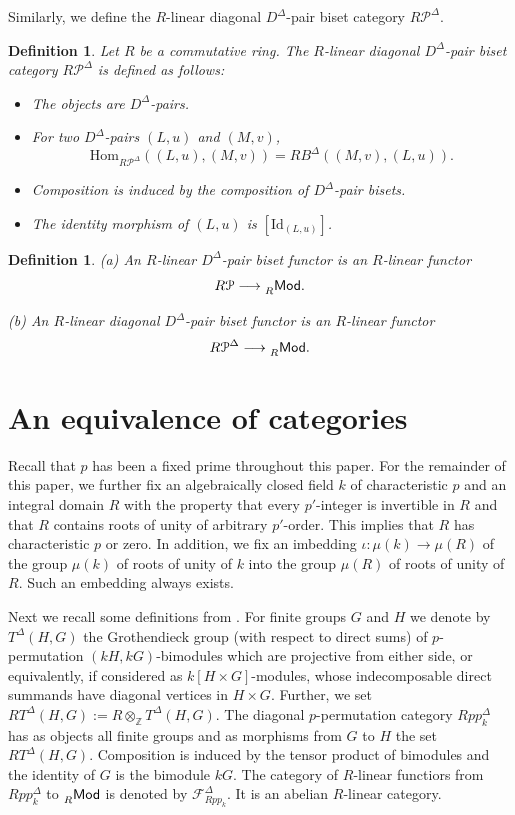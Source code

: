 \documentclass[11pt]{article}
\theoremstyle{change}  %
\newtheorem{definition}[theorem]{Definition}
\newcommand{\calF}{\mathcal{F}}
\newcommand{\calP}{\mathcal{P}}
\newcommand{\catfont}{\mathsf}
\newcommand{\Hom}{\mathrm{Hom}}
\newcommand{\lMod}[1]{\llap{\phantom{|}}_{#1}\catfont{Mod}}
\newcommand{\ZZ}{\mathbb{Z}}
\newcommand{\Id}{\mathrm{Id}}
\newcommand{\DD}{D^{\Delta}}
\begin{document}
Similarly, we define the $R$-linear diagonal $\DD$-pair biset category $R \calP^{\Delta}$.

\begin{definition}
	Let $R$ be a commutative ring. The $R$-linear diagonal $\DD$-pair biset category $R \calP^{\Delta}$ is defined as follows:
	\begin{itemize}
		\item The objects are $\DD$-pairs.
		\item For two $\DD$-pairs $(L,u)$ and $(M,v)$,
		\[
		\Hom_{R \calP^\Delta}((L,u),(M,v))=R B^\Delta((M,v),(L,u)).
		\]
		\item Composition is induced by the composition of $\DD$-pair bisets. 
		\item The identity morphism of $(L,u)$ is $[\Id_{(L,u)}]$.
	\end{itemize}
\end{definition} 

\begin{definition}
	{\rm (a)} An $R$-linear $\DD$-pair biset functor is an $R$-linear functor
	\[
	R\calP \longrightarrow \lMod{R}.
	\]
	
	\smallskip
	{\rm (b)} An $R$-linear diagonal $\DD$-pair biset functor is an $R$-linear functor
	\[
	R\calP^\Delta \longrightarrow \lMod{R}.
	\]
\end{definition}


\section{An equivalence of categories}\label{sec an equivalence}

Recall that $p$ has been a fixed prime throughout this paper. For the remainder of this paper, we further fix an algebraically closed field $k$ of characteristic $p$ and an integral domain $R$ with the property that every $p'$-integer is invertible in $R$ and that $R$ contains roots of unity of arbitrary $p'$-order. This implies that $R$ has characteristic $p$ or zero. In addition, we fix an imbedding $\iota\colon \mu(k)\to \mu(R)$ of the group $\mu(k)$ of roots of unity of $k$ into the group $\mu(R)$ of roots of unity of $R$. Such an embedding always exists. 

\smallskip
Next we recall some definitions from \cite{BoucYilmaz2020}.
For finite groups $G$ and $H$ we denote by $T^\Delta(H,G)$ the Grothendieck group  (with respect to direct sums) of $p$-permutation $(kH,kG)$-bimodules which are projective from either side, or equivalently, if considered as $k[H\times G]$-modules, whose indecomposable direct summands have
diagonal vertices in $H\times G$. Further, we set $RT^\Delta(H,G):=R\otimes_\ZZ T^\Delta(H,G)$. The diagonal $p$-permutation category $Rpp_k^\Delta$ has as objects all finite groups and as morphisms from $G$ to $H$ the set $RT^\Delta(H,G)$. Composition is induced by the tensor product of bimodules and the identity of $G$ is the bimodule $kG$. The category of $R$-linear functiors from $Rpp_k^\Delta$ to $\lMod{R}$ is denoted by $\calF^\Delta_{Rpp_k}$. It is an abelian $R$-linear category.
\end{document}
